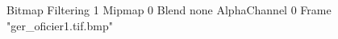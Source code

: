 {Bitmap
	{Filtering 1}
	{Mipmap 0}
	{Blend none}
	{AlphaChannel 0}
	{Frame "ger_oficier1.tif.bmp"}
}
